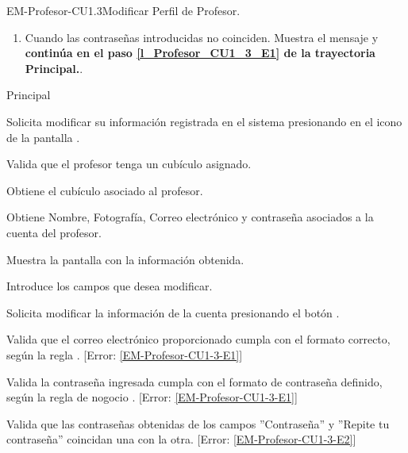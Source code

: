 \begin{UseCase}{EM-Profesor-CU1.3}{Modificar Perfil de Profesor.}
{\begin{enumerate}
			\item \label{EM-Profesor-CU1-3-E2} Cuando las contraseñas introducidas no coinciden. Muestra el mensaje  y \textbf{continúa en el paso \ref{l_Profesor_CU1_3_E1} de la trayectoria Principal.}.
		\end{enumerate}
	}
\end{UseCase}

\begin{UCtrayectoria}{Principal}

	\UCpaso [\UCactor] Solicita modificar su información registrada en el sistema
	presionando en el icono  de la pantalla .

	\UCpaso Valida que el profesor tenga un cubículo asignado.  

	\UCpaso Obtiene el cubículo asociado al profesor. 

	\UCpaso Obtiene Nombre, Fotografía, Correo electrónico y contraseña
	asociados a la cuenta del profesor. \label{l_EM_Profesor_CU1_3_SinCubo}

	\UCpaso Muestra la pantalla  con la información obtenida. 

	\UCpaso[\UCactor] Introduce los campos que desea modificar. \label{l_Profesor_CU1_3_E1}

	\UCpaso [\UCactor] Solicita modificar la información de la cuenta
	presionando el botón .
	
	\UCpaso Valida que el correo electrónico proporcionado cumpla con el formato correcto, según la regla . [Error: \ref{EM-Profesor-CU1-3-E1}]

    \UCpaso Valida la contraseña ingresada cumpla con el formato de contraseña definido, según la regla de nogocio . [Error: \ref{EM-Profesor-CU1-3-E1}]

    \UCpaso Valida que las contraseñas obtenidas de los campos ''Contraseña'' y ''Repite tu contraseña'' coincidan una con la otra. [Error: \ref{EM-Profesor-CU1-3-E2}]


\end{UCtrayectoria}
